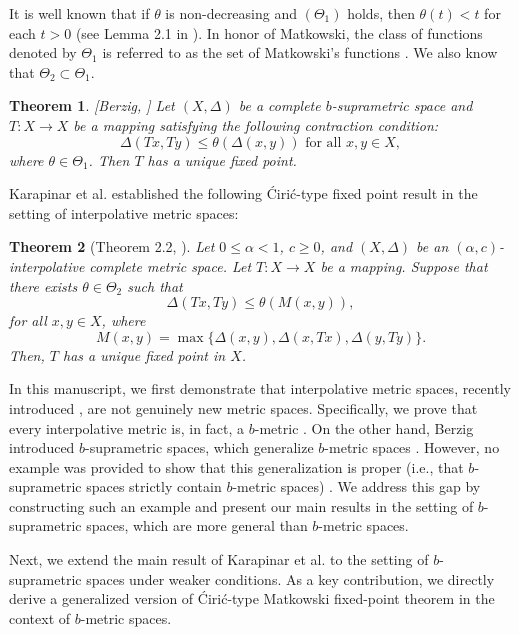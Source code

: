 \documentclass[pdflatex,sn-mathphys-num]{sn-jnl}%
\theoremstyle{thmstyleone}%
\newtheorem{theorem}{Theorem}%
\theoremstyle{thmstyletwo}%
\theoremstyle{thmstylethree}%
\begin{document}
It is well known that if \( \theta \) is non-decreasing and \( (\Theta_1) \) holds, then \( \theta(t) < t \) for each \( t > 0 \) (see Lemma 2.1 in \cite{samet2012fixed}). In honor of Matkowski, the class of functions denoted by \( \Theta_1 \) is referred to as the set of Matkowski's functions \cite{matkowski1975integrable}. We also know that \( \Theta_2 \subset \Theta_1 \).

\begin{theorem}\label{berzic-matko}[Berzig, \cite{berzig2024nonlinear}]
Let \( (X, \Delta) \) be a complete \( b \)-suprametric space and \( T: X \to X \) be a mapping satisfying the following contraction condition:
\[
\Delta(Tx, Ty) \leq \theta(\Delta(x, y)) \text{ for all } x, y \in X,
\]
where \( \theta \in \Theta_1 \). Then \( T \) has a unique fixed point.
\end{theorem}

Karapinar et al. established the following Ćirić-type fixed point result in the setting of interpolative metric spaces:
\begin{theorem}[Theorem 2.2, \cite{karapinar2025some}]
Let \( 0 \leq \alpha < 1 \), \( c \geq 0 \), and \( (X, \Delta) \) be an \( (\alpha, c) \)-interpolative complete metric space. Let \( T: X \to X \) be a mapping. Suppose that there exists \( \theta \in \Theta_2 \) such that
\[
\Delta(Tx, Ty) \leq \theta(M(x, y)),
\]
for all \( x, y \in X \), where
\[
M(x, y) = \max\{\Delta(x, y), \Delta(x, Tx), \Delta(y, Ty)\}.
\]
Then, \( T \) has a unique fixed point in \( X \).
\end{theorem}

In this manuscript, we first demonstrate that interpolative metric spaces, recently introduced \cite{karapinara2024interpolative}, are not genuinely new metric spaces. Specifically, we prove that every interpolative metric is, in fact, a \( b \)-metric \cite{karapinara2024interpolative}. On the other hand, Berzig introduced \( b \)-suprametric spaces, which generalize \( b \)-metric spaces \cite{berzig2024nonlinear}. However, no example was provided to show that this generalization is proper (i.e., that \( b \)-suprametric spaces strictly contain \( b \)-metric spaces) \cite{berzig2024nonlinear}. We address this gap by constructing such an example and present our main results in the setting of \( b \)-suprametric spaces, which are more general than \( b \)-metric spaces.

Next, we extend the main result of Karapinar et al. \cite{karapinar2025some} to the setting of \( b \)-suprametric spaces under weaker conditions. As a key contribution, we directly derive a generalized version of Ćirić-type Matkowski fixed-point theorem in the context of \( b \)-metric spaces.
\end{document}
